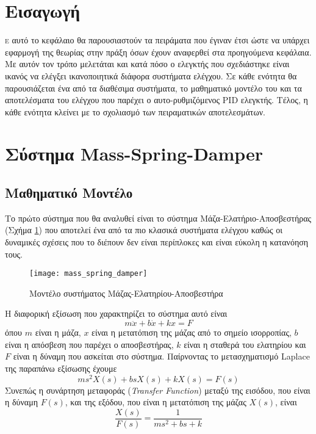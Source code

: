 


\section{Εισαγωγή}

\lettrine[findent=2pt]{}{ε} αυτό το κεφάλαιο θα παρουσιαστούν τα πειράματα που έγιναν έτσι ώστε να υπάρχει εφαρμογή της θεωρίας στην πράξη όσων έχουν αναφερθεί στα προηγούμενα κεφάλαια. Με αυτόν τον τρόπο μελετάται και κατά πόσο ο ελεγκτής που σχεδιάστηκε είναι ικανός να ελέγξει ικανοποιητικά διάφορα συστήματα ελέγχου. Σε κάθε ενότητα θα παρουσιάζεται ένα από τα διαθέσιμα συστήματα, το μαθηματικό μοντέλο του και τα αποτελέσματα του ελέγχου που παρέχει ο αυτο-ρυθμιζόμενος PID ελεγκτής. Τέλος, η κάθε ενότητα κλείνει με το σχολιασμό των πειραματικών αποτελεσμάτων.

\section{Σύστημα Mass-Spring-Damper} \label{sec:mass_spring_damper}

\subsection{Μαθηματικό Μοντέλο}

Το πρώτο σύστημα που θα αναλυθεί είναι το σύστημα Μάζα-Ελατήριο-Αποσβεστήρας (Σχήμα \ref{fig:mass_spring_damper}) που αποτελεί ένα από τα πιο κλασικά συστήματα ελέγχου καθώς οι δυναμικές σχέσεις που το διέπουν δεν είναι περίπλοκες και είναι εύκολη η κατανόηση τους.

\begin{figure}[h]
  \centering
  \texttt{[image: mass\_spring\_damper]}
  \caption{Μοντέλο συστήματος Μάζας-Ελατηρίου-Αποσβεστήρα}
  \label{fig:mass_spring_damper}
\end{figure}

\noindent
H διαφορική εξίσωση που χαρακτηρίζει το σύστημα αυτό είναι
\begin{equation}
m\ddot{x} + b\dot{x} + kx = F
\label{eq:mass_springer_damper_ode}
\end{equation}
όπου $m$ είναι η μάζα, $x$ είναι η μετατόπιση της μάζας από το σημείο ισορροπίας, $b$ είναι η απόσβεση που παρέχει ο αποσβεστήρας, $k$ είναι η σταθερά του ελατηρίου και $F$ είναι η δύναμη που ασκείται στο σύστημα. Παίρνοντας το μετασχηματισμό Laplace της παραπάνω εξίσωσης έχουμε
\begin{equation}
ms^2X(s) + bsX(s) + kX(s) = F(s)
\label{eq:mass_springer_damper_laplace}
\end{equation}
Συνεπώς η συνάρτηση μεταφοράς (\emph{Transfer Function}) μεταξύ της εισόδου, που είναι η δύναμη $F(s)$, και της εξόδου, που είναι η μετατόπιση της μάζας $X(s)$, είναι
\begin{equation}
\frac{X(s)}{F(s)} = \frac{1}{ms^2 + bs + k}
\end{equation}


